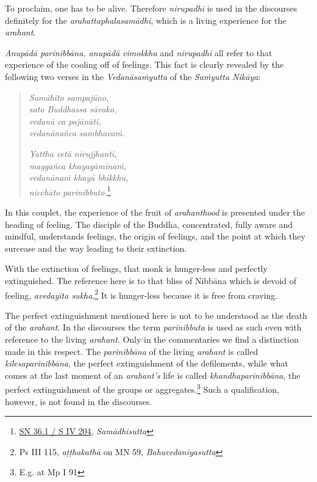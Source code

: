 To proclaim, one has to be alive. Therefore \emph{nirupadhi} is used in the discourses definitely for the \emph{arahattaphalasamādhi}, which is a living experience for the \emph{arahant}.

\emph{Anupādā parinibbāna, anupādā vimokkha} and \emph{nirupadhi} all refer to that experience of the cooling off of feelings. This fact is clearly revealed by the following two verses in the \emph{Vedanāsaṁyutta} of the \emph{Saṁyutta Nikāya}:

\begin{quote}
\emph{Samāhito sampajāno,}\\
\emph{sato Buddhassa sāvako,}\\
\emph{vedanā ca pajānāti,}\\
\emph{vedanānañca sambhavaṁ.}

\emph{Yattha cetā nirujjhanti,}\\
\emph{maggañca khayagāminaṁ,}\\
\emph{vedanānaṁ khayā bhikkhu,}\\
\emph{nicchāto parinibbuto.}\footnote{\href{https://suttacentral.net/sn36.1/pli/ms}{SN 36.1 / S IV 204}, \emph{Samādhisutta}}
\end{quote}

In this couplet, the experience of the fruit of \emph{arahanthood} is presented under the heading of feeling. The disciple of the Buddha, concentrated, fully aware and mindful, understands feelings, the origin of feelings, and the point at which they surcease and the way leading to their extinction.

With the extinction of feelings, that monk is hunger-less and perfectly extinguished. The reference here is to that bliss of Nibbāna which is devoid of feeling, \emph{avedayita sukha}.\footnote{Ps III 115, \emph{aṭṭhakathā} on MN 59, \emph{Bahuvedanīyasutta}} It is hunger-less because it is free from craving.

The perfect extinguishment mentioned here is not to be understood as the death of the \emph{arahant}. In the discourses the term \emph{parinibbuta} is used as such even with reference to the living \emph{arahant}. Only in the commentaries we find a distinction made in this respect. The \emph{parinibbāna} of the living \emph{arahant} is called \emph{kilesaparinibbāna}, the perfect extinguishment of the defilements, while what comes at the last moment of an \emph{arahant's} life is called \emph{khandhaparinibbāna}, the perfect extinguishment of the groups or aggregates.\footnote{E.g. at Mp I 91} Such a qualification, however, is not found in the discourses.

